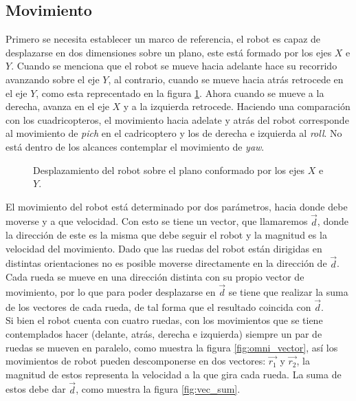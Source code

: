 \documentclass{iccmemoria}
\begin{document}
\subsection{Movimiento}

Primero se necesita establecer un marco de referencia, el robot es capaz de desplazarse en dos dimensiones sobre un plano, este está formado por los ejes $X$ e $Y$. Cuando se menciona que el robot se mueve hacia adelante hace su recorrido avanzando sobre el eje $Y$, al contrario, cuando se mueve hacia atrás retrocede en el eje $Y$, como esta reprecentado en la figura \ref{fig:omni_direcition}. Ahora cuando se mueve a la derecha, avanza en el eje $X$ y a la izquierda retrocede. Haciendo una comparación con los cuadricopteros, el movimiento hacia adelate y atrás del robot corresponde al movimiento de \emph{pich} en el cadricoptero y los de derecha e izquierda al \emph{roll}. No está dentro de los alcances contemplar el movimiento de \emph{yaw}.\\

\begin{figure}[H]
  \centering
  \selectfont{
  
  }
  \caption{Desplazamiento del robot sobre el plano conformado por los ejes $X$ e $Y$.}
  \label{fig:omni_direcition}
\end{figure}

El movimiento del robot está determinado por dos parámetros, hacia donde debe moverse y a que velocidad. Con esto se tiene un vector, que llamaremos $\vec{d}$, donde la dirección de este es la misma que debe seguir el robot y la magnitud es la velocidad del movimiento. Dado que las ruedas del robot están dirigidas en distintas orientaciones no es posible moverse directamente en la dirección de $\vec{d}$. Cada rueda se mueve en una dirección distinta con su propio vector de movimiento, por lo que para poder desplazarse en $\vec{d}$ se tiene que realizar la suma de los vectores de cada rueda, de tal forma que el resultado coincida con $\vec{d}$.\\

Si bien el robot cuenta con cuatro ruedas, con los movimientos que se tiene contemplados hacer (delante, atrás, derecha e izquierda) siempre un par de ruedas se mueven en paralelo, como muestra la figura \ref{fig:omni_vector}, así los movimientos de robot pueden descomponerse en dos vectores: $\vec{r_{1}}$ y $\vec{r_{2}}$, la magnitud de estos representa la velocidad a la que gira cada rueda. La suma de estos debe dar $\vec{d}$, como muestra la figura \ref{fig:vec_sum}.\\
\end{document}
